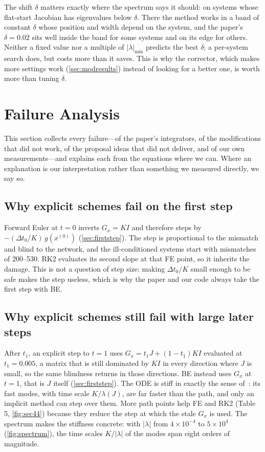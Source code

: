 \documentclass[11pt,a4paper]{article}
\newcommand{\xo}{x^{(0)}}
\begin{document}
\begin{finding}
The shift $\delta$ matters exactly where the spectrum says it should: on systems whose flat-start Jacobian has
eigenvalues below $\delta$. There the method works in a band of constant $\delta$ whose position and width
depend on the system, and the paper's $\delta=0.02$ sits well inside the band for some systems and on its
edge for others. Neither a fixed value nor a multiple of $|\lambda|_{\min}$ predicts the best $\delta$; a
per-system search does, but costs more than it saves. This is why the corrector, which makes more settings
work (\cref{sec:modresults}) instead of looking for a better one, is worth more than tuning $\delta$.
\end{finding}

\section{Failure Analysis}\label{sec:failure}

This section collects every failure---of the paper's integrators, of the modifications that did not work,
of the proposal ideas that did not deliver, and of our own measurements---and explains each from the
equations where we can. Where an explanation is our interpretation rather than something we measured
directly, we say so.

\subsection{Why explicit schemes fail on the first step}
Forward Euler at $t=0$ inverts $G_x=KI$ and therefore steps by $-(\Delta t_0/K)\,g(\xo)$
(\cref{sec:firststep}). The step is proportional to the mismatch and blind to the network, and the
ill-conditioned systems start with mismatches of 200--530. RK2 evaluates its second slope at that FE point,
so it inherits the damage. This is not a question of step size: making $\Delta t_0/K$ small enough to be
safe makes the step useless, which is why the paper and our code always take the first step with BE.

\subsection{Why explicit schemes still fail with large later steps}
After $t_1$, an explicit step to $t=1$ uses $G_x=t_1J+(1-t_1)KI$ evaluated at $t_1=0.005$, a matrix
that is still dominated by $KI$ in every direction where $J$ is small, so the same blindness returns in
those directions. BE instead uses $G_x$ at $t=1$, that is $J$ itself (\cref{sec:firststep}). The ODE is stiff
in exactly the sense of~\cite{hairer1996}: its fast modes, with time scale $K/\lambda(J)$, are far faster
than the path, and only an implicit method can step over them. More path points help FE and RK2 (Table 5,
\cref{fig:sec44}) because they reduce the step at which the stale $G_x$ is used. The spectrum makes the
stiffness concrete: with $|\lambda|$ from $4\times10^{-4}$ to $5\times10^{4}$ (\cref{fig:spectrum}), the time
scales $K/|\lambda|$ of the modes span eight orders of magnitude.
\end{document}
